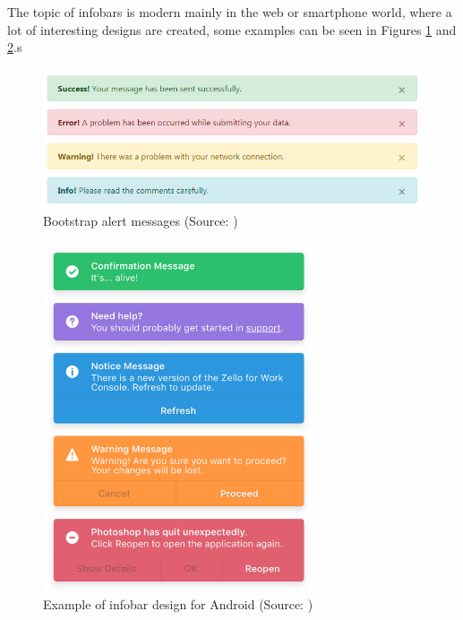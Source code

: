\documentclass[a4paper,10pt,twoside]{article}
\begin{document}
\noindent The topic of infobars is modern mainly in the web or
smartphone world, where a lot of interesting designs are created, some
examples can be seen in Figures \ref{fig:bootstrap_infobar} and
\ref{fig:infobar_android}.s

\vspace{0.3cm}
\begin{figure}[hbt!] 
\begin{center}
\includegraphics[width=15cm]{../pictures/bootstrap_infobar.png} 
\caption[Bootstrap alert messages]{Bootstrap alert messages (Source: \cite{bootstrap})}
\label{fig:bootstrap_infobar}
\end{center}
\end{figure}

\vspace{0.3cm}
\begin{figure}[hbt!] 
\begin{center}
\includegraphics[width=8cm]{../pictures/infobar_android.png} 
\caption[Example of infobar design for Android]{Example of infobar design for Android (Source: \cite{pinterest})}
\label{fig:infobar_android}
\end{center}
\end{figure}
\end{document}

